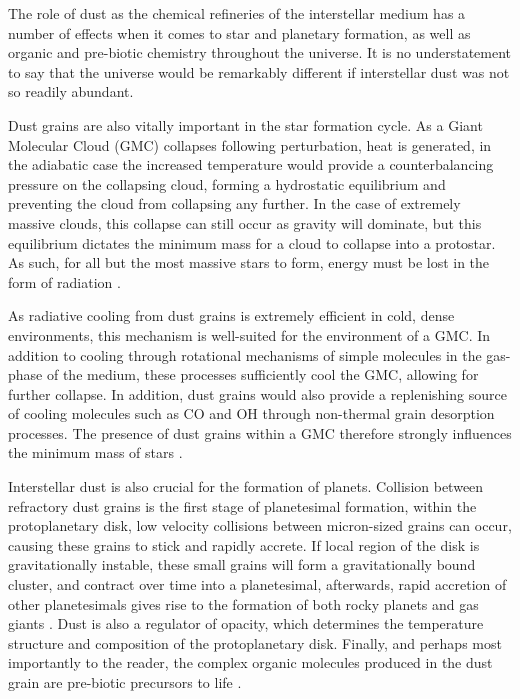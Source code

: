 The role of dust as the chemical refineries of the interstellar medium has a number of effects when it comes to star and planetary formation, as well as organic and pre-biotic chemistry throughout the universe.
It is no understatement to say that the universe would be remarkably different if interstellar dust was not so readily abundant.

Dust grains are also vitally important in the star formation cycle.
As a Giant Molecular Cloud (GMC) collapses following perturbation, heat is generated, in the adiabatic case the increased temperature would provide a counterbalancing pressure on the collapsing cloud, forming a hydrostatic equilibrium and preventing the cloud from collapsing any further.
In the case of extremely massive clouds, this collapse can still occur as gravity will dominate, but this equilibrium dictates the minimum mass for a cloud to collapse into a protostar.
As such, for all but the most massive stars to form, energy must be lost in the form of radiation
\parencite{ward-thompsonIntroductionStarFormation2011}.

As radiative cooling from dust grains is extremely efficient in cold, dense environments, this mechanism is well-suited for the environment of a GMC.
In addition to cooling through rotational mechanisms of simple molecules in the gas-phase of the medium, these processes sufficiently cool the GMC, allowing for further collapse.
In addition, dust grains would also provide a replenishing source of cooling molecules such as CO and OH through non-thermal grain desorption processes.
The presence of dust grains within a GMC therefore strongly influences the minimum mass of stars
\parencite{williamsChemistryCosmicDust2015}.

Interstellar dust is also crucial for the formation of planets.
Collision between refractory dust grains is the first stage of planetesimal formation, within the protoplanetary disk, low velocity collisions between micron-sized grains can occur, causing these grains to stick and rapidly accrete.
If local region of the disk is gravitationally instable, these small grains will form a gravitationally bound cluster, and contract over time into a planetesimal, afterwards, rapid accretion of other planetesimals gives rise to the formation of both rocky planets and gas giants
\parencite{apaiProtoplanetaryDustAstrophysical2010}.
Dust is also a regulator of opacity, which determines the temperature structure and composition of the protoplanetary disk.
Finally, and perhaps most importantly to the reader, the complex organic molecules produced in the dust grain are pre-biotic precursors to life
\parencite{birnstielDustEvolutionFormation2016}.

